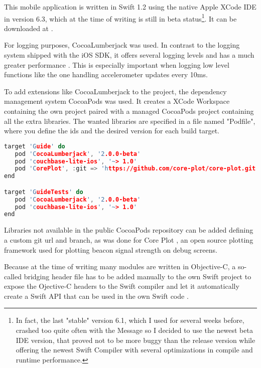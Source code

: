 This mobile application is written in Swift 1.2 using the native Apple XCode IDE in version 6.3, which at the time of writing is still in beta status\footnote{In fact, the last "stable" version 6.1, which I used for several weeks before, crashed too quite often with the Message so I decided to use the newest beta IDE version, that proved not to be more buggy than the release version while offering the newest Swift Compiler with several optimizations in compile and runtime performance.}. It can be downloaded at \cite{xcodebeta}.


For logging purposes, CocoaLumberjack \cite{cocoalumberjack}
was used. In contrast to the logging system shipped with the iOS SDK, it offers several logging levels and has a much greater performance \cite{clperf}. 
This is especially important when logging low level functions like the one handling accelerometer updates every 10ms.

To add extensions like CocoaLumberjack to the project, the dependency management system CocoaPods \cite{cocoapods}
was used. It creates a XCode Workspace containing the own project paired with a managed CocoaPods project containing all the extra libraries. The wanted libraries are specified in a file named "Podfile", where you define the ids and the desired version for each build target. 

\begin{lstlisting}[caption={The CocoaPods file of the CA Guide front end XCode project},basicstyle=\small\ttfamily,language=c,aboveskip=15pt]
target 'Guide' do
   pod 'CocoaLumberjack', '2.0.0-beta'
   pod 'couchbase-lite-ios', '~> 1.0'
   pod 'CorePlot', :git => 'https://github.com/core-plot/core-plot.git', :branch => 'release-2.0'
end

target 'GuideTests' do
   pod 'CocoaLumberjack', '2.0.0-beta'
   pod 'couchbase-lite-ios', '~> 1.0'
end
\end{lstlisting}


Libraries not available in the public CocoaPods repository can be added defining a custom git url and branch, as was done for Core Plot \cite{coreplot}, an open source plotting framework used for plotting beacon signal strength on debug screens. 

Because at the time of writing many modules are written in Objective-C, a so-called bridging header file
has to be added manually to the own Swift project to expose the Ojective-C headers to the Swift compiler and let it automatically create a Swift API that can be used in the own Swift code \cite[p. 71, chapter "Importing Objective-C into Swift"]{swift-objc-book}.

